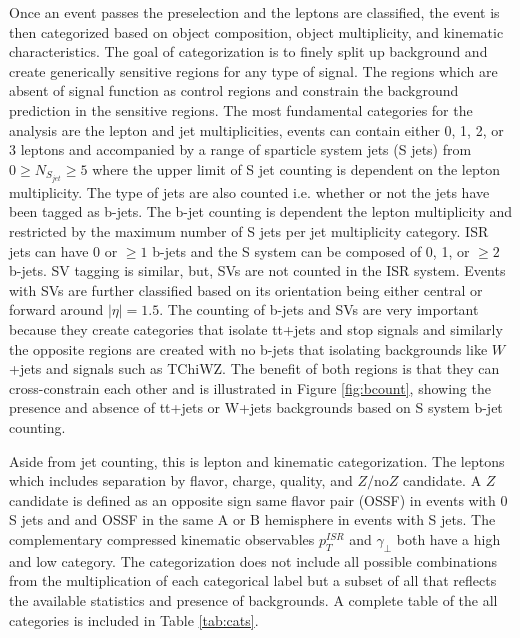 Once an event passes the preselection and the leptons are classified, the event is then categorized based on object composition, object multiplicity, and kinematic characteristics. The goal of categorization is to finely split up background and create generically sensitive regions for any type of signal. The regions which are absent of signal function as control regions and constrain the background prediction in the sensitive regions. The most fundamental categories for the analysis are the lepton and jet multiplicities, events can contain either 0, 1, 2, or 3 leptons and accompanied by a range of sparticle system jets (S jets) from $0\geq N_{S_{jet}} \geq 5$ where the upper limit of S jet counting is dependent on the lepton multiplicity. The type of jets are also counted i.e. whether or not the jets have been tagged as b-jets. The b-jet counting is dependent the lepton multiplicity and restricted by the maximum number of S jets per jet multiplicity category.  ISR jets can have 0 or $\geq 1$ b-jets and the S system can be composed of 0, 1, or $\geq2$ b-jets. SV tagging is similar, but, SVs are not counted in the ISR system. Events with SVs are further classified based on its orientation being either central or forward around $|\eta|=1.5$. The counting of b-jets and SVs are very important because they create categories that isolate tt+jets and stop signals and similarly the opposite regions are created with no b-jets that isolating backgrounds like $W$+jets and signals such as TChiWZ. The benefit of both regions is that they can cross-constrain each other and is illustrated in Figure \ref{fig:bcount}, showing the presence and absence of tt+jets or W+jets backgrounds based on S system b-jet counting.

Aside from jet counting, this is lepton and kinematic categorization. The leptons which includes separation by flavor, charge, quality, and $Z/\text{no} Z$ candidate.  A $Z$ candidate is defined as an opposite sign same flavor pair (OSSF) in events with 0 S jets and and OSSF in the same A or B hemisphere in events with S jets. The complementary compressed kinematic observables $p_T^{ISR}$ and $\gamma_\perp$ both have a high and low category.  The categorization does not include all possible combinations from the multiplication of each categorical label but a subset of all that reflects the available statistics and presence of backgrounds. A complete table of the all categories is included in Table \ref{tab:cats}. 

